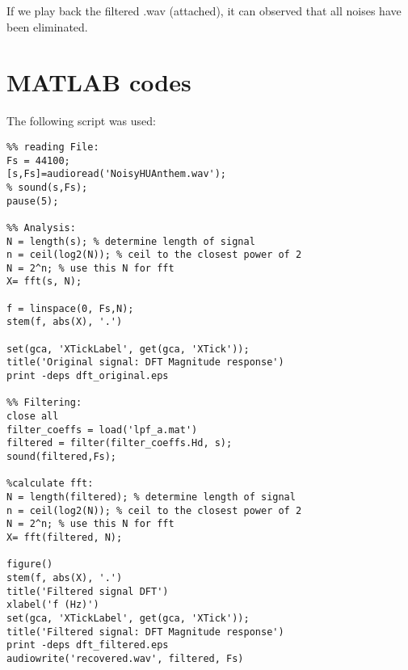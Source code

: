 \documentclass[12pt,letterpaper]{article}
\begin{document}
If we play back the filtered .wav (attached), it can observed that all noises have been eliminated.  

\section*{MATLAB codes}
The following script was used: 

\begin{lstlisting}
%% reading File: 
Fs = 44100; 
[s,Fs]=audioread('NoisyHUAnthem.wav'); 
% sound(s,Fs); 
pause(5); 

%% Analysis: 
N = length(s); % determine length of signal 
n = ceil(log2(N)); % ceil to the closest power of 2
N = 2^n; % use this N for fft 
X= fft(s, N); 

f = linspace(0, Fs,N);
stem(f, abs(X), '.')

set(gca, 'XTickLabel', get(gca, 'XTick'));
title('Original signal: DFT Magnitude response')
print -deps dft_original.eps

%% Filtering: 
close all
filter_coeffs = load('lpf_a.mat')
filtered = filter(filter_coeffs.Hd, s);
sound(filtered,Fs);

%calculate fft: 
N = length(filtered); % determine length of signal 
n = ceil(log2(N)); % ceil to the closest power of 2
N = 2^n; % use this N for fft 
X= fft(filtered, N);

figure()
stem(f, abs(X), '.')
title('Filtered signal DFT')
xlabel('f (Hz)')
set(gca, 'XTickLabel', get(gca, 'XTick'));
title('Filtered signal: DFT Magnitude response')
print -deps dft_filtered.eps
audiowrite('recovered.wav', filtered, Fs)

\end{lstlisting}
\end{document}
